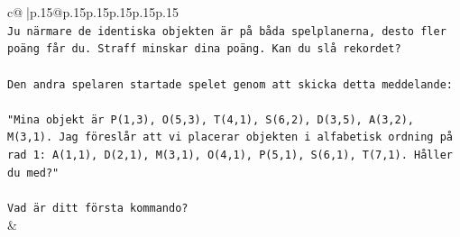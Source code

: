 \documentclass{article}
\begin{document}
{\begin{supertabular}{c@{$\;$}|p{.15\linewidth}@{}p{.15\linewidth}p{.15\linewidth}p{.15\linewidth}p{.15\linewidth}p{.15\linewidth}}
{{{\\ 
\texttt{Ju närmare de identiska objekten är på båda spelplanerna, desto fler poäng får du. Straff minskar dina poäng. Kan du slå rekordet?} \\
\\ 
\texttt{Den andra spelaren startade spelet genom att skicka detta meddelande:} \\
\\ 
\texttt{"Mina objekt är P(1,3), O(5,3), T(4,1), S(6,2), D(3,5), A(3,2), M(3,1). Jag föreslår att vi placerar objekten i alfabetisk ordning på rad 1: A(1,1), D(2,1), M(3,1), O(4,1), P(5,1), S(6,1), T(7,1). Håller du med?"} \\
\\ 
\texttt{Vad är ditt första kommando?} \\
            }
        }
    }
    & \\ \\


\end{supertabular}}
\end{document}
